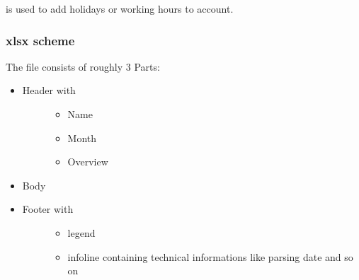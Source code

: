 \documentclass[letterpaper,10pt,english]{sphinxmanual}
\begin{document}
 is used to add holidays or working hours to account.


\subsubsection{xlsx scheme}
\label{\detokenize{devmanual:xlsx-scheme}}
The  file consists of roughly 3 Parts:
\begin{itemize}
\item {} \begin{description}
\item[{Header with}] \leavevmode\begin{itemize}
\item {} 
Name

\item {} 
Month

\item {} 
Overview

\end{itemize}

\end{description}

\item {} 
Body

\item {} \begin{description}
\item[{Footer with}] \leavevmode\begin{itemize}
\item {} 
legend

\item {} 
infoline containing technical informations like parsing date and so on

\end{itemize}

\end{description}

\end{itemize}
\end{document}
